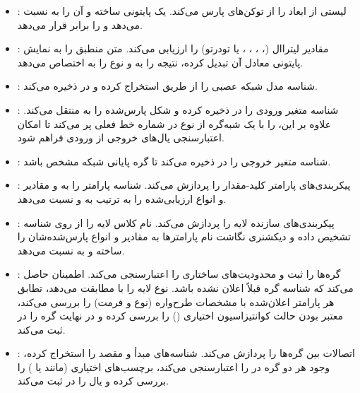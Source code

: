 \documentclass{nngraph-fa}
\begin{document}
\begin{itemize}
    \item \textbf{}: لیستی از ابعاد را از توکن‌های  پارس می‌کند. یک  پایتونی ساخته و آن را به  نسبت می‌دهد و  را برابر  قرار می‌دهد.
    \item \textbf{}: مقادیر لیتراال (، ، ، ،  یا  تودرتو) را ارزیابی می‌کند. متن منطبق را به نمایش پایتونی معادل آن تبدیل کرده، نتیجه را به  و نوع را به  اختصاص می‌دهد.
    \item \textbf{}: شناسه مدل شبکه عصبی را از طریق  استخراج کرده و در  ذخیره می‌کند.
    \item \textbf{}: شناسه متغیر ورودی را در  ذخیره کرده و شکل پارس‌شده را به  منتقل می‌کند. علاوه بر این،  را با یک شبه‌گره از نوع  در شماره خط فعلی پر می‌کند تا امکان اعتبارسنجی یال‌های خروجی از ورودی فراهم شود.
    \item \textbf{}: شناسه متغیر خروجی را در  ذخیره می‌کند تا گره پایانی شبکه مشخص باشد.
    \item \textbf{}: پیکربندی‌های پارامتر کلید-مقدار را پردازش می‌کند. شناسه پارامتر را به  و مقادیر و انواع ارزیابی‌شده را به ترتیب به  و  نسبت می‌دهد.
    \item \textbf{}: پیکربندی‌های سازنده لایه را پردازش می‌کند. نام کلاس لایه را از روی شناسه تشخیص داده و دیکشنری نگاشت نام پارامترها به مقادیر و انواع پارس‌شده‌شان را ساخته و به  نسبت می‌دهد.
    \item \textbf{}: گره‌ها را ثبت و محدودیت‌های ساختاری را اعتبارسنجی می‌کند. اطمینان حاصل می‌کند که شناسه گره قبلاً اعلان نشده باشد. نوع لایه را با  مطابقت می‌دهد، تطابق هر پارامتر اعلان‌شده با مشخصات طرح‌واره (نوع و فرمت) را بررسی می‌کند، معتبر بودن حالت کوانتیزاسیون اختیاری () را بررسی کرده و در نهایت گره را در  ثبت می‌کند.
    \item \textbf{}: اتصالات بین گره‌ها را پردازش می‌کند. شناسه‌های مبدأ و مقصد را استخراج کرده، وجود هر دو گره در  را اعتبارسنجی می‌کند، برچسب‌های اختیاری (مانند  یا ) را بررسی کرده و یال را در  ثبت می‌کند.

\end{itemize}
\end{document}

